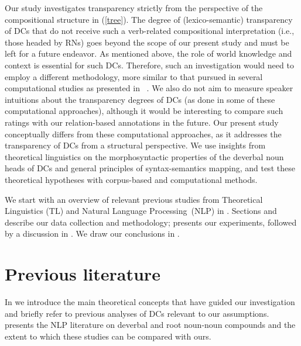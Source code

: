 \documentclass[output=paper]{langsci/langscibook}
\begin{document}
 Our study investigates transparency strictly from the perspective of the compositional structure in  (\ref{tree}). The degree of (lexico-semantic) transparency of DCs that do not receive such a verb-related compositional interpretation (i.e., those headed by RNs) goes beyond the scope of our present study and must be left for a future endeavor. As mentioned above, the role of world knowledge and context is essential for such DCs. Therefore, such an investigation would need to employ a different methodology, more similar to that pursued in several computational studies as presented in  ~. We also do not aim to measure speaker intuitions about the transparency degrees of DCs (as done in some of these computational approaches), although it would be interesting to compare such ratings with our relation-based annotations  in the future. Our present study conceptually differs from these computational approaches, as it addresses the transparency of DCs from a structural perspective. We use insights from theoretical linguistics on the morphosyntactic properties of the deverbal noun heads of DCs and general principles of syntax-semantics mapping, and test these theoretical hypotheses  with corpus-based and computational methods.

We start with an overview of relevant  {previous studies from Theoretical Linguistics (TL)} and  {Natural Language Processing~(NLP)} in .
Sections  and  describe our data collection and methodology;  presents our experiments, followed by a discussion in . We draw our conclusions in .






\section{Previous literature}\label{sec:previous:lit}
In  we introduce the main theoretical concepts  that have guided our investigation and briefly refer to previous analyses of DCs relevant to our assumptions.  presents the  {NLP} literature on  {deverbal and root} noun-noun compounds and the extent to which these studies can be compared with ours.
\end{document}

